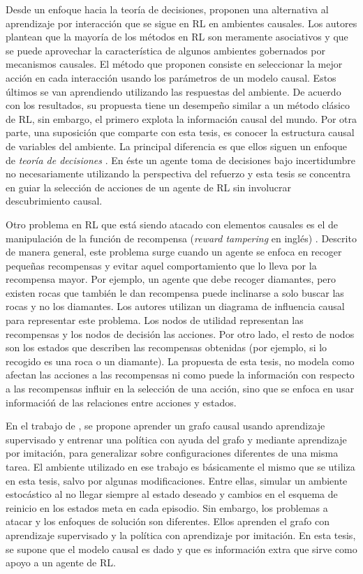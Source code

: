Desde un enfoque hacia la teoría de decisiones, \citet{playingagainstnature2018} proponen una alternativa al aprendizaje por interacción que se sigue en RL en ambientes causales. Los autores plantean que la mayoría de los métodos en RL son meramente asociativos y que se puede aprovechar la característica de algunos ambientes gobernados por mecanismos causales. El método que proponen consiste en seleccionar la mejor acción 
	en cada interacción usando los parámetros de un modelo causal. Estos últimos se van aprendiendo utilizando las respuestas del ambiente. De acuerdo con los resultados, su propuesta tiene un desempeño similar a un método clásico de RL, sin embargo, el primero explota la información causal del mundo. Por otra parte, una suposición que comparte con esta tesis, es conocer la estructura causal de variables del ambiente. La principal diferencia es que ellos siguen un enfoque de
	\textit{teoría de decisiones} \cite{sep-decision-theory}. En éste un agente toma de decisiones bajo incertidumbre no necesariamente utilizando la perspectiva del refuerzo y esta tesis se concentra en guiar la selección de acciones de un agente de RL sin involucrar descubrimiento causal.

Otro problema en RL que está siendo atacado con elementos causales es el de manipulación de la función de recompensa (\textit{reward tampering} en inglés) \cite{everitt2019reward}. Descrito de manera general, este problema surge cuando un agente 
se enfoca en recoger pequeñas recompensas y evitar aquel comportamiento que lo lleva por la recompensa mayor. Por ejemplo, un agente que debe recoger diamantes, pero existen rocas que también le dan recompensa puede inclinarse a solo buscar las rocas y no los diamantes. Los autores utilizan un diagrama de influencia causal para representar este problema. Los nodos de utilidad representan las recompensas y los nodos de decisión las acciones. Por otro lado, el resto de nodos son los estados que describen las recompensas obtenidas (por ejemplo, si lo recogido es una roca o un diamante).
La propuesta de esta tesis, no modela como afectan las acciones a las recompensas ni como puede la información con respecto a las recompensas influir en la selección de una acción, sino que se enfoca en usar informacióń de las relaciones entre acciones y estados.

En el trabajo de \citet{nair2019causal}, se propone
aprender un grafo causal usando aprendizaje supervisado y
entrenar una política con ayuda del grafo y mediante aprendizaje por imitación, para generalizar sobre 
configuraciones diferentes de una misma
tarea.
El ambiente utilizado en ese trabajo es básicamente el mismo que se utiliza en esta
tesis, salvo por algunas modificaciones. Entre ellas, simular un ambiente estocástico al no llegar siempre al estado deseado y cambios en el esquema de reinicio en los estados meta en cada episodio. Sin embargo, los problemas a atacar y los enfoques
de solución son diferentes. Ellos aprenden el grafo con aprendizaje supervisado y
la política con aprendizaje por imitación. En esta tesis, se supone que
el modelo causal es dado y que es información extra que sirve como apoyo a un agente de RL.



